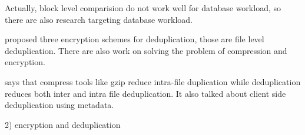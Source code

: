 Actually, block level comparision do not work well for database workload, so there are also research targeting database workload. 

\citep{francinasurvey} proposed three encryption schemes for deduplication, those are file level deduplication.
There are also work on solving the problem of compression and encryption\citep{zheng2017minicrypt}.

\citep{mandagere2008demystifying} says that compress tools like gzip reduce intra-file duplication while deduplication reduces both inter and intra file deduplication. It also talked about client side deduplication using metadata.

2) encryption and deduplication 



